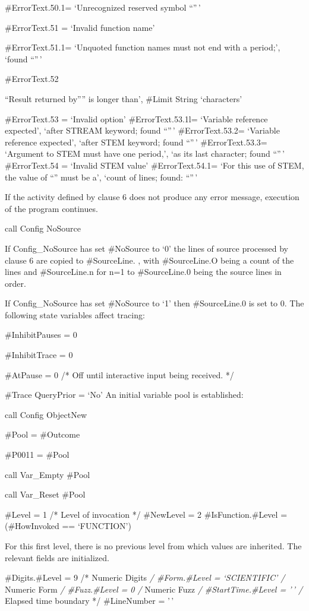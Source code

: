 \#ErrorText.50.1= `Unrecognized reserved symbol ``''\,'

\#ErrorText.51 = `Invalid function name'

\#ErrorText.51.1= `Unquoted function names must not end with a period;',
`found ``''\,'

\#ErrorText.52

``Result returned by'''' is longer than', \#Limit String `characters'

\#ErrorText.53 = `Invalid option' \#ErrorText.53.1l= `Variable reference
expected', `after STREAM keyword; found ``''\,' \#ErrorText.53.2=
`Variable reference expected', `after STEM keyword; found ``''\,'
\#ErrorText.53.3= `Argument to STEM must have one period,', `as its last
character; found ``''\,' \#ErrorText.54 = `Invalid STEM value'
\#ErrorText.54.1= `For this use of STEM, the value of ``'' must be a',
`count of lines; found: ``''\,'

If the activity defined by clause 6 does not produce any error message,
execution of the program continues.

call Config NoSource

If Config\_NoSource has set \#NoSource to `0' the lines of source
processed by clause 6 are copied to \#SourceLine. , with \#SourceLine.O
being a count of the lines and \#SourceLine.n for n=1 to \#SourceLine.0
being the source lines in order.

If Config\_NoSource has set \#NoSource to `1' then \#SourceLine.0 is set
to 0. The following state variables affect tracing:

\#InhibitPauses = 0

\#InhibitTrace = 0

\#AtPause = 0 /* Off until interactive input being received. */

\#Trace QueryPrior = `No' An initial variable pool is established:

call Config ObjectNew

\#Pool = \#Outcome

\#P0011 = \#Pool

call Var\_Empty \#Pool

call Var\_Reset \#Pool

\#Level = 1 /* Level of invocation */ \#NewLevel = 2
\#IsFunction.\#Level = (\#HowInvoked == `FUNCTION')

For this first level, there is no previous level from which values are
inherited. The relevant fields are initialized.

\#Digits.\#Level = 9 /* Numeric Digits \emph{/ \#Form.\#Level =
`SCIENTIFIC' /} Numeric Form \emph{/ \#Fuzz.\#Level = 0 /} Numeric Fuzz
\emph{/ \#StartTime.\#Level = '\,' /} Elapsed time boundary */
\#LineNumber = '\,'

